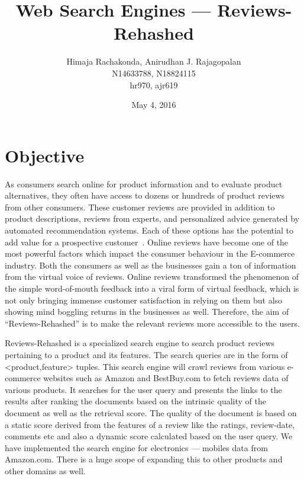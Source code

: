 \documentclass{article}
\begin{document}
\title{Web Search Engines --- Reviews-Rehashed}
\date{May 4, 2016}
\author{Himaja Rachakonda, Anirudhan J. Rajagopalan\\ N14633788, N18824115\\ hr970, ajr619}
\maketitle
\newpage

\section{Objective}

As consumers search online for product information and to evaluate product alternatives, they often have access to dozens or hundreds of product reviews from other consumers. These customer reviews are provided in addition to product descriptions, reviews from experts, and personalized advice generated by automated recommendation systems. Each of these options has the potential to add value for a prospective customer~\cite{mudambi2010makes}. Online reviews have become one of the most powerful factors which impact the consumer behaviour in the E-commerce industry. Both the consumers as well as the businesses gain a ton of information from the virtual voice of reviews. Online reviews transformed the phenomenon of the simple word-of-mouth feedback into a viral form of virtual feedback, which is not only bringing immense customer satisfaction in relying on them but also showing mind boggling returns in the businesses as well. Therefore, the aim of ``Reviews-Rehashed'' is to make the relevant reviews more accessible to the users. 

Reviews-Rehashed is a specialized search engine to search product reviews pertaining to a product and its features. The search queries are in the form of <product,feature> tuples. This search engine will crawl reviews from various e-commerce websites such as Amazon and BestBuy.com to fetch reviews data of various products. It searches for the user query and presents the links to the results after ranking the documents based on the intrinsic quality of the document as well as the retrieval score. The quality of the document is based on a static score derived from the features of a review like the ratings, review-date, comments etc and also a dynamic score calculated based on the user query. We have implemented the search engine for electronics --- mobiles data from Amazon.com. There is a huge scope of expanding this to other products and other domains as well.
\end{document}
